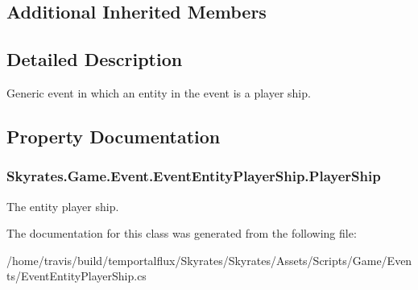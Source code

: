 \subsection*{Additional Inherited Members}


\subsection{Detailed Description}
Generic event in which an entity in the event is a player ship. 



\subsection{Property Documentation}
\hypertarget{class_skyrates_1_1_game_1_1_event_1_1_event_entity_player_ship_a87aeaecccf2800c74ef4ce196f9ac999}{
\subsubsection[{Player\-Ship}]{ Skyrates.\-Game.\-Event.\-Event\-Entity\-Player\-Ship.\-Player\-Ship\hspace{0.3cm}{\ttfamily [get]}}}\label{class_skyrates_1_1_game_1_1_event_1_1_event_entity_player_ship_a87aeaecccf2800c74ef4ce196f9ac999}


The entity player ship. 



The documentation for this class was generated from the following file\-:\begin{DoxyCompactItemize}
\item 
/home/travis/build/temportalflux/\-Skyrates/\-Skyrates/\-Assets/\-Scripts/\-Game/\-Events/Event\-Entity\-Player\-Ship.\-cs\end{DoxyCompactItemize}
